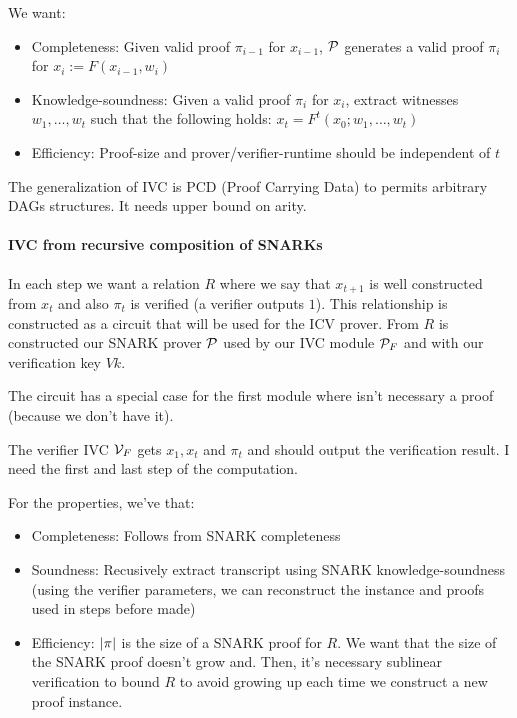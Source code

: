   We want:
  \begin{itemize}
    \item Completeness: Given valid proof $\pi_{i-1}$ for $x_{i-1}$, $\mathcal{P}$ generates 
      a valid proof $\pi_i$ for $x_i := F(x_{i-1}, w_i)$
    \item Knowledge-soundness: Given a valid proof $\pi_i$ for $x_i$, extract 
      witnesses $w_1,\dots,w_t$ such that the following holds: $x_t = F^t(x_0;w_1,\dots,w_t)$
    \item Efficiency: Proof-size and prover/verifier-runtime should be independent of $t$
  \end{itemize}
  \begin{remark}
    The generalization of IVC is PCD (Proof Carrying Data) to permits arbitrary DAGs 
    structures. It needs upper bound on arity.
  \end{remark}

  \paragraph{IVC from recursive composition of SNARKs}
  In each step we want a relation $R$ where we say that $x_{t+1}$ is well constructed 
  from $x_t$ and also $\pi_t$ is verified (a verifier outputs $1$).
  This relationship is constructed as a circuit that will be used for the ICV prover.
  From $R$ is constructed our SNARK prover $\mathcal{P}$ used by our IVC module $\mathcal{P}_F$
  and with our verification key $Vk$.
  \begin{remark}
    The circuit has a special case for the first module where isn't necessary a proof 
    (because we don't have it).
  \end{remark}

  The verifier IVC $\mathcal{V}_F$ gets $x_1,x_t$ and $\pi_t$ and should output the verification
  result. I need the first and last step of the computation.

  For the properties, we've that:
  \begin{itemize}
    \item Completeness: Follows from SNARK completeness 
    \item Soundness: Recusively extract transcript using SNARK knowledge-soundness
      (using the verifier parameters, we can reconstruct the instance and proofs 
      used in steps before made)
    \item Efficiency: $\left| \pi \right|$ is the size of a SNARK proof for $R$.
      We want that the size of the SNARK proof doesn't grow and.
      Then, it's necessary sublinear verification to bound $R$ to avoid
      growing up each time we construct a new proof instance.
  \end{itemize}

